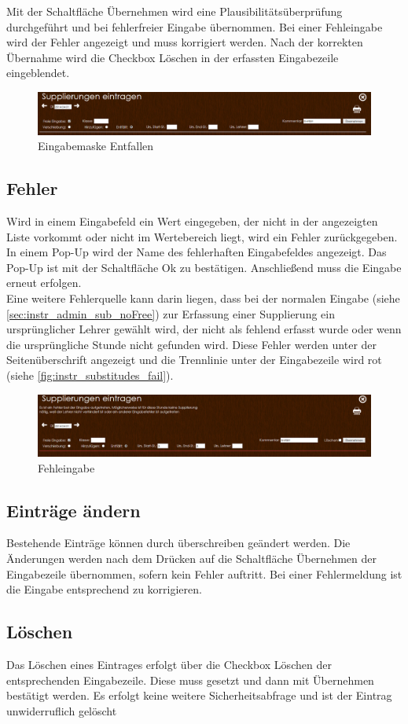 Mit der Schaltfläche Übernehmen wird eine Plausibilitätsüberprüfung durchgeführt und bei fehlerfreier Eingabe übernommen. Bei einer Fehleingabe wird der Fehler angezeigt und muss korrigiert werden. Nach der korrekten Übernahme wird die Checkbox Löschen in der erfassten Eingabezeile eingeblendet.
\begin{figure}[H]
\centering
\includegraphics[keepaspectratio=true, width=17cm]{images/screenshots/substitudes_remove.png}
\caption{Eingabemaske Entfallen}
\label{fig:instr_substitudes_subRemove}
\end{figure}
\subsection{Fehler}
Wird in einem Eingabefeld ein Wert eingegeben, der nicht in der angezeigten Liste vorkommt oder nicht im Wertebereich liegt, wird ein Fehler zurückgegeben. In einem Pop-Up wird der Name des fehlerhaften Eingabefeldes angezeigt. Das Pop-Up ist mit der Schaltfläche Ok zu bestätigen. Anschließend muss die Eingabe erneut erfolgen.\\
Eine weitere Fehlerquelle kann darin liegen, dass bei der normalen Eingabe (siehe \autoref{sec:instr_admin_sub_noFree}) zur Erfassung einer Supplierung ein ursprünglicher Lehrer gewählt wird, der nicht als fehlend erfasst wurde oder wenn die ursprüngliche Stunde nicht gefunden wird. Diese Fehler werden unter der Seitenüberschrift angezeigt und die Trennlinie unter der Eingabezeile wird rot (siehe \autoref{fig:instr_substitudes_fail}).
\begin{figure}[H]
\centering
\includegraphics[keepaspectratio=true, width=17cm]{images/screenshots/substitudes_fail.png}
\caption{Fehleingabe}
\label{fig:instr_substitudes_fail}
\end{figure}
\subsection{Einträge ändern}
Bestehende Einträge können durch überschreiben geändert werden. Die Änderungen werden nach dem Drücken auf die Schaltfläche Übernehmen der Eingabezeile übernommen, sofern kein Fehler auftritt. Bei einer Fehlermeldung ist die Eingabe entsprechend zu korrigieren.
\subsection{Löschen}
Das Löschen eines Eintrages erfolgt über die Checkbox Löschen der entsprechenden Eingabezeile. Diese muss gesetzt und dann mit Übernehmen bestätigt werden. Es erfolgt keine weitere Sicherheitsabfrage und ist der Eintrag unwiderruflich gelöscht